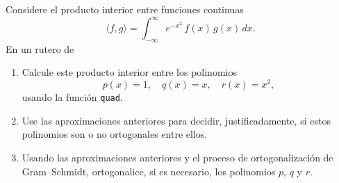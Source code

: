 Considere el producto interior entre funciones continuas
$$
\langle f,g\rangle =\int_{-\infty}^\infty e^{-x^2}\,f(x)\,g(x) \, dx.
$$
En un rutero de \matlab
\begin{enumerate}
\item Calcule este producto interior entre los polinomios
$$
p(x)=1, \quad q(x)=x, \quad r(x)=x^2,
$$
usando la funci\'on \texttt{quad}.
\item Use las aproximaciones anteriores para decidir, justificadamente, si estos polinomios son o no ortogonales entre ellos.

\respuesta{3cm}

\item Usando las aproximaciones anteriores y el proceso de ortogonalizaci\'on de Gram--Schmidt, ortogonalice, si es necesario, los polinomios $p$, $q$ y $r$.

\respuesta{4cm}

\end{enumerate}
